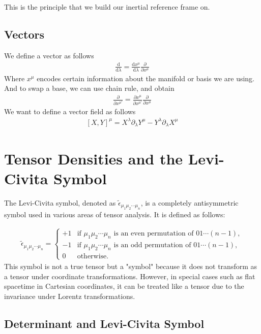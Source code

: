 \documentclass[11pt,letterpaper]{book}
\newcommand{\pypx}[2]{\frac{\partial #1}{\partial #2}}
\newcommand{\dydx}[2]{\frac{\text{d} #1}{\text{d} #2}}
\newcommand{\sqbkt}[1]{\left[ #1 \right]}
\begin{document}
This is the principle that we build our inertial reference frame on. 

\subsection{Vectors}
We define a vector as follows
\begin{align}
\dydx{}{\lambda} = \dydx{x^\mu}{\lambda}\pypx{}{x^\mu}
\end{align}
Where $x^\mu$ encodes certain information about the manifold or basis we are using. And to swap a base, we can use chain rule, and obtain
\begin{align}
\pypx{}{x^{\mu'}} = \pypx{x^{\mu}}{x^{\mu'}}\pypx{}{x^{\mu}}
\end{align}
We want to define a vector field as follows
\begin{align}
\sqbkt{X,Y}^\mu = X^{\lambda}\partial_{\lambda}Y^{\mu}-Y^{\lambda}\partial_{\lambda}X^{\mu}
\end{align}

\section{Tensor Densities and the Levi-Civita Symbol}

The Levi-Civita symbol, denoted as \( \tilde{\epsilon}_{\mu_1 \mu_2 \cdots \mu_n} \), is a completely antisymmetric symbol used in various areas of tensor analysis. It is defined as follows:

\begin{align}
\tilde{\epsilon}_{\mu_1 \mu_2 \cdots \mu_n} =
\begin{cases} 
+1 & \text{if } \mu_1 \mu_2 \cdots \mu_n \text{ is an even permutation of } 01 \cdots (n-1), \\
-1 & \text{if } \mu_1 \mu_2 \cdots \mu_n \text{ is an odd permutation of } 01 \cdots (n-1), \\
0  & \text{otherwise.}
\end{cases}
\end{align}
This symbol is not a true tensor but a "symbol" because it does not transform as a tensor under coordinate transformations. However, in special cases such as flat spacetime in Cartesian coordinates, it can be treated like a tensor due to the invariance under Lorentz transformations.

\subsection{Determinant and Levi-Civita Symbol}
\end{document}
